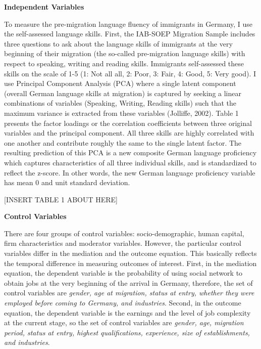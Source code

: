 \documentclass[12pt,a4paper]{article}
\begin{document}
\begin{flushleft}
\textbf{Independent Variables} 
\end{flushleft}

To measure the pre-migration language fluency of immigrants in Germany, I use the self-assessed language skills. First, the IAB-SOEP Migration Sample includes three questions to ask about the language skills of immigrants at the very beginning of their migration (the so-called pre-migration language skills) with respect to speaking, writing and reading skills. Immigrants self-assessed these skills on the scale of 1-5 (1: Not all all, 2: Poor, 3: Fair, 4: Good, 5: Very good). I use Principal Component Analysis (PCA) where a single latent component (overall German language skills at migration) is captured by seeking a linear combinations of variables (Speaking, Writing, Reading skills) such that the maximum variance is extracted from these variables (Jolliffe, 2002). Table 1 presents the factor loadings or the correlation coefficients between three original variables and the principal component. All three skills are highly correlated with one another and contribute roughly the same to the single latent factor. The resulting prediction of this PCA is a new composite German language proficiency which captures characteristics of all three individual skills, and is standardized to reflect the z-score. In other words, the new German language proficiency variable has mean 0 and unit standard deviation. 

\begin{center}
[INSERT TABLE 1 ABOUT HERE]
\end{center}

\begin{flushleft}
\textbf{Control Variables} 
\end{flushleft}

There are four groups of control variables: socio-demographic, human capital, firm characteristics and moderator variables. However, the particular control variables differ in the mediation and the outcome equation. This basically reflects the temporal difference in measuring outcomes of interest. First, in the mediation equation, the dependent variable is the probability of using social network to obtain jobs at the very beginning of the arrival in Germany, therefore, the set of control variables are \textit{gender, age at migration, status at entry, whether they were employed before coming to Germany, and industries}. Second, in the outcome equation, the dependent variable is the earnings and the level of job complexity at the current stage, so the set of control variables are \textit{gender, age, migration period, status at entry, highest qualifications, experience, size of establishments, and industries}.
\end{document}
